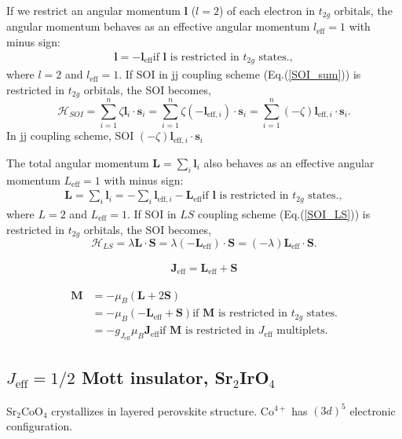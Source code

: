 If we restrict an angular momentum $\bm{l}$ ($l = 2$) of each electron in $t_{2g}$ orbitals, the angular momentum behaves as an effective angular momentum $l_\mathrm{eff} = 1$ with minus sign:
\begin{align}
  \bm{l} = -\bm{l_\mathrm{eff}} \text{if $\bm{l}$ is restricted in $t_{2g}$ states.},
\end{align}
where $l = 2$ and $l_\mathrm{eff} = 1$.
If SOI in jj coupling scheme (Eq.(\ref{SOI_sum})) is restricted in $t_{2g}$ orbitals, the SOI becomes,
\begin{equation}
\mathcal{H}_{SOI} = \sum^n_{i=1} \zeta\bm{l}_i\cdot\bm{s}_i = \sum^n_{i=1} \zeta(-\bm{l}_{\mathrm{eff}, i})\cdot\bm{s}_i = \sum^n_{i=1} (-\zeta)\bm{l}_{\mathrm{eff}, i}\cdot\bm{s}_i.
\end{equation}
In jj coupling scheme, SOI $(-\zeta)\bm{l}_{\mathrm{eff}, i}\cdot\bm{s}_i$

The total angular momentum $\bm{L} = \sum_i\bm{l}_i$ also behaves as an effective angular momentum $L_\mathrm{eff} = 1$ with minus sign:
\begin{align}
  \bm{L} = \sum_i\bm{l}_i = -\sum_i\bm{l}_{\mathrm{eff}, i}-\bm{L_\mathrm{eff}} \text{if $\bm{l}$ is restricted in $t_{2g}$ states.},
\end{align}
where $L = 2$ and $L_\mathrm{eff} = 1$.
If SOI in $LS$ coupling scheme (Eq.(\ref{SOI_LS})) is restricted in $t_{2g}$ orbitals, the SOI becomes,
\begin{equation}
\mathcal{H}_{LS} = \lambda\bm{L}\cdot\bm{S} = \lambda(-\bm{L}_\mathrm{eff})\cdot\bm{S} =  (-\lambda)\bm{L}_\mathrm{eff}\cdot\bm{S}.
\end{equation}

\begin{align}
  \bm{J}_\mathrm{eff} = \bm{L_\mathrm{eff}} + \bm{S}
\end{align}

\begin{align}
  \bm{M} &= -\mu_B(\bm{L} + 2\bm{S})\\
  &= -\mu_B(-\bm{L}_\mathrm{eff}+\bm{S}) \text{if $\bm{M}$ is restricted in $t_{2g}$ states.}\\
  &= -g_{J_{\mathrm{eff}}}\mu_B\bm{J}_\mathrm{eff} \text{if $\bm{M}$ is restricted in $J_\mathrm{eff}$ multiplets.}
\end{align}


\subsection{$J_{\mathrm{eff}} = 1/2$ Mott insulator, Sr$_2$IrO$_4$}
Sr$_2$CoO$_4$ crystallizes in layered perovskite structure.
Co$^{4+}$ has $(3d)^5$ electronic configuration.


